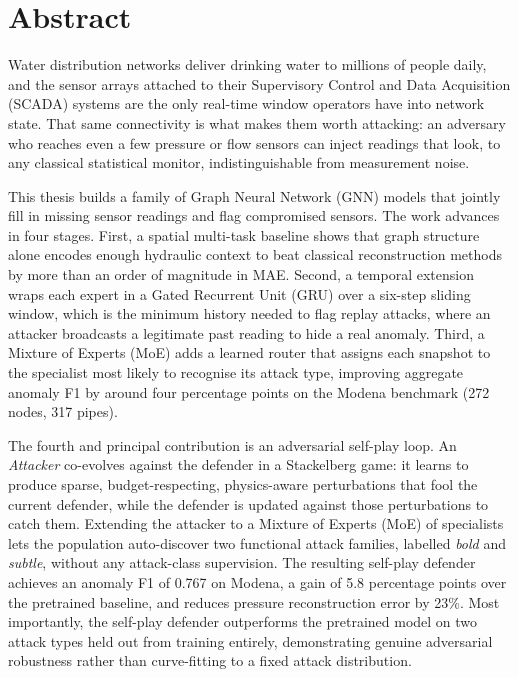 \chapter*{Abstract}

Water distribution networks deliver drinking water to millions of
people daily, and the sensor arrays attached to their
Supervisory Control and Data Acquisition (SCADA) systems are the only real-time window operators
have into network state. That same connectivity is what makes them
worth attacking: an adversary who reaches even a few pressure or
flow sensors can inject readings that look, to any classical
statistical monitor, indistinguishable from measurement noise.

This thesis builds a family of Graph Neural Network (GNN) models that jointly
fill in missing sensor readings and flag compromised sensors. The
work advances in four stages. First,
a spatial multi-task \gnn{} baseline shows that graph structure alone
encodes enough hydraulic context to beat classical reconstruction
methods by more than an order of magnitude in MAE. Second,
a temporal extension wraps each expert in a Gated Recurrent Unit (GRU) over a
six-step sliding window, which is the minimum history needed to flag
replay attacks, where an attacker broadcasts a legitimate past reading
to hide a real anomaly. Third, a Mixture of Experts (MoE) adds a learned router
that assigns each snapshot to the specialist most likely to recognise
its attack type, improving aggregate anomaly F1 by around four
percentage points on the Modena benchmark (272 nodes, 317 pipes).

The fourth and principal contribution is an adversarial self-play
loop. An \emph{Attacker} \gnn{} co-evolves against the defender in a
Stackelberg game: it learns to produce sparse, budget-respecting,
physics-aware perturbations that fool the current defender, while the
defender is updated against those perturbations to catch them.
Extending the attacker to a Mixture of Experts (MoE) of specialists lets the
population auto-discover two functional attack families, labelled
\emph{bold} and \emph{subtle}, without any attack-class supervision.
The resulting self-play defender achieves an anomaly F1 of 0.767 on
Modena, a gain of 5.8 percentage points over the pretrained baseline,
and reduces pressure reconstruction error by 23\%. Most importantly,
the self-play defender outperforms the pretrained model on two attack
types held out from training entirely, demonstrating genuine
adversarial robustness rather than curve-fitting to a fixed attack
distribution.

